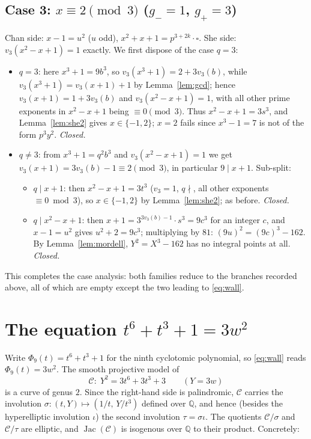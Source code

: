 \documentclass[11pt]{article}
\theoremstyle{remark}
\newcommand{\Q}{\mathbb{Q}}
\newcommand{\vp}{v}
\begin{document}
\subsection*{Case 3: $x\equiv2\pmod3$ ($g_-=1$, $g_+=3$)}
Chan side: $x-1=u^2$ ($u$ odd), $x^2+x+1=p^{3+2k}\cdot\square$. She side: $\vp_3(x^2-x+1)=1$ exactly. We first dispose of the case $q=3$:
\begin{itemize}
\item $q=3$: here $x^3+1=9b^3$, so $\vp_3(x^3+1)=2+3\vp_3(b)$, while $\vp_3(x^3+1)=\vp_3(x+1)+1$ by Lemma~\ref{lem:gcd}; hence $\vp_3(x+1)=1+3\vp_3(b)$ and $\vp_3(x^2-x+1)=1$, with all other prime exponents in $x^2-x+1$ being $\equiv0\pmod3$. Thus $x^2-x+1=3s^3$, and Lemma~\ref{lem:she2} gives $x\in\{-1,2\}$; $x=2$ fails since $x^3-1=7$ is not of the form $p^3y^2$. \emph{Closed.}
\item $q\neq3$: from $x^3+1=q^2b^3$ and $\vp_3(x^2-x+1)=1$ we get $\vp_3(x+1)=3\vp_3(b)-1\equiv2\pmod 3$, in particular $9\mid x+1$. Sub-split:
  \begin{itemize}
  \item $q\mid x+1$: then $x^2-x+1=3t^3$ ($\vp_3=1$, $q\nmid$, all other exponents $\equiv0\bmod 3$), so $x\in\{-1,2\}$ by Lemma~\ref{lem:she2}; as before. \emph{Closed.}
  \item $q\mid x^2-x+1$: then $x+1=3^{3\vp_3(b)-1}\cdot s^3=9c^3$ for an integer $c$, and $x-1=u^2$ gives $u^2+2=9c^3$; multiplying by $81$: $(9u)^2=(9c)^3-162$. By Lemma~\ref{lem:mordell}, $Y^2=X^3-162$ has no integral points at all. \emph{Closed.}
  \end{itemize}
\end{itemize}

This completes the case analysis: both families reduce to the branches recorded above, all of which are empty except the two leading to \eqref{eq:wall}.

\section{The equation $t^6+t^3+1=3w^2$}\label{sec:wall}

Write $\Phi_9(t)=t^6+t^3+1$ for the ninth cyclotomic polynomial, so \eqref{eq:wall} reads $\Phi_9(t)=3w^2$. The smooth projective model of
\[
\mathcal{C}:\; Y^2=3t^6+3t^3+3 \qquad (Y=3w)
\]
is a curve of genus $2$. Since the right-hand side is palindromic, $\mathcal{C}$ carries the involution $\sigma:(t,Y)\mapsto(1/t,\,Y/t^3)$ defined over $\Q$, and hence (besides the hyperelliptic involution $\iota$) the second involution $\tau=\sigma\iota$. The quotients $\mathcal{C}/\sigma$ and $\mathcal{C}/\tau$ are elliptic, and $\operatorname{Jac}(\mathcal{C})$ is isogenous over $\Q$ to their product. Concretely:
\end{document}
